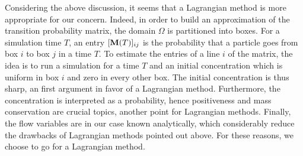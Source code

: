 Considering the above discussion, it seems that a Lagrangian method is more appropriate for our concern. Indeed, in order to build an approximation of the transition probability matrix, the domain $\Omega$ is partitioned into boxes. For a simulation time $T$, an entry $[\mathbf M(T)]_{ij}$ is the probability that a particle goes from box $i$ to box $j$ in a time $T$. To estimate the entries of a line $i$ of the matrix, the idea is to run a simulation for a time $T$ and an initial concentration which is uniform in box $i$ and zero in every other box. The initial concentration is thus sharp, an first argument in favor of a Lagrangian method. Furthermore, the concentration is interpreted as a probability, hence positiveness and mass conservation are crucial topics, another point for Lagrangian methods. Finally, the flow variables are in our case known analytically, which considerably reduce the drawbacks of Lagrangian methods pointed out above. For these reasons, we choose to go for a Lagrangian method. 


